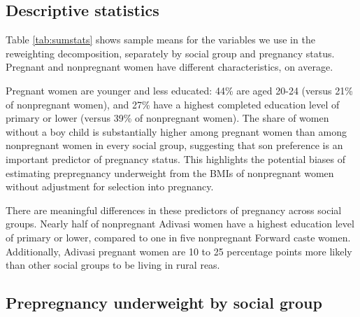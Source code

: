 \documentclass[12pt]{article}
\begin{document}
\subsection*{Descriptive statistics}

Table \ref{tab:sumstats} shows sample means for the variables we use in the reweighting decomposition, separately by social group and pregnancy status. Pregnant and nonpregnant women have different characteristics, on average. 

Pregnant women are younger and less educated: 44\% are aged 20-24 (versus 21\% of nonpregnant women), and 27\% have a highest completed education level of primary or lower (versus 39\% of nonpregnant women). The share of women without a boy child is substantially higher among pregnant women than among nonpregnant women in every social group, suggesting that son preference is an important predictor of pregnancy status. This highlights the potential biases of estimating prepregnancy underweight from the BMIs of nonpregnant women without adjustment for selection into pregnancy.


There are meaningful differences in these predictors of pregnancy across social groups. Nearly half of nonpregnant Adivasi women have a highest education level of primary or lower, compared to one in five nonpregnant Forward caste women. Additionally, Adivasi pregnant women are 10 to 25 percentage points more likely than other social groups to be living in rural reas. 


\subsection*{Prepregnancy underweight by social group}
\end{document}
